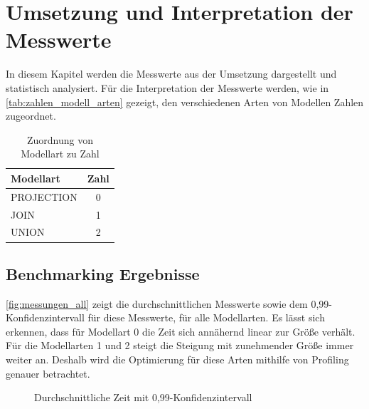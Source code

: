 \chapter{Umsetzung und Interpretation der Messwerte}
In diesem Kapitel werden die Messwerte aus der Umsetzung dargestellt und
statistisch analysiert. Für die Interpretation der Messwerte werden, wie in
\autoref{tab:zahlen_modell_arten} gezeigt, den verschiedenen Arten von Modellen
Zahlen zugeordnet. 
\begin{table}[h]
\centering
\begin{tabular}{lc}
\toprule
\textbf{Modellart} & \textbf{Zahl} \\
\midrule
PROJECTION & 0\\
JOIN & 1\\
UNION & 2\\
\bottomrule
\end{tabular}
\caption{Zuordnung von Modellart zu Zahl }
\label{tab:zahlen_modell_arten}
\end{table}

\section{Benchmarking Ergebnisse}
\autoref{fig:messungen_all} zeigt die durchschnittlichen Messwerte sowie dem
0,99-Konfidenzintervall für diese Messwerte, für alle Modellarten.
Es lässt sich erkennen, dass für Modellart 0 die Zeit sich annähernd linear zur
Größe verhält. Für die Modellarten 1 und 2 steigt die Steigung mit zunehmender Größe
immer weiter an. Deshalb wird die Optimierung für diese Arten mithilfe von
Profiling genauer betrachtet.

\begin{figure}[h]
    \begin{center}
    \end{center}
\caption{Durchschnittliche Zeit mit 0,99-Konfidenzintervall}\label{fig:messungen_all}
\end{figure}

